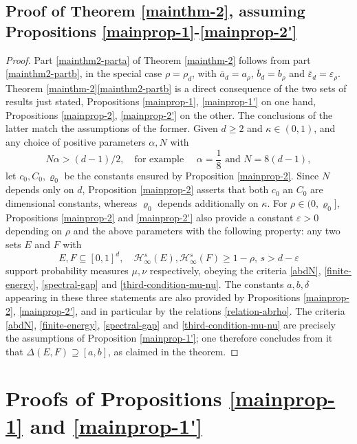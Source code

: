 \documentclass[a4paper,11pt]{amsart}
\numberwithin{equation}{section}
\begin{document}
\subsection{Proof of Theorem \ref{mainthm-2}, assuming Propositions \ref{mainprop-1}-\ref{mainprop-2'}} \label{mainthm-2-proof-section} 
\begin{proof} 
Part \eqref{mainthm2-parta} of Theorem \ref{mainthm-2} follows from part \eqref{mainthm2-partb}, in the special case $\rho = \rho_d$, with $\bar{a}_d = a_{\rho}$, $\bar{b}_d = b_{\rho}$ and $\bar{\varepsilon}_d = \varepsilon_{\rho}$. Theorem \ref{mainthm-2}\eqref{mainthm2-partb} is a direct consequence of the two sets of results just stated, Propositions \ref{mainprop-1}, \ref{mainprop-1'} on one hand, Propositions \ref{mainprop-2}, \ref{mainprop-2'} on the other. The conclusions of the latter match the assumptions of the former. 
\vskip0.1in
\noindent Given $d \geq 2$ and $\kappa \in (0,1)$, and any choice of positive parameters $\alpha, N$ with  
\[N \alpha > (d-1)/2, \quad \text{for example } \quad \alpha = \frac18 \text{ and }  N = 8(d-1), \] 
let $c_0, C_0, \varrho_0$ be the constants ensured by Proposition \ref{mainprop-2}. Since $N$ depends only on $d$, Proposition \ref{mainprop-2} asserts that both $c_0$ an $C_0$ are dimensional constants, whereas $\varrho_0$ depends additionally on $\kappa$. For $\rho \in (0, \varrho_0]$, Propositions \ref{mainprop-2} and \ref{mainprop-2'} also provide a constant $\varepsilon > 0$ depending on $\rho$ and the above parameters with the following property: 
any two sets $E$ and $F$ with   
\[ E, F \subseteq [0,1]^d, \quad \mathcal H^s_{\infty}(E), \mathcal H^s_{\infty}(F) \geq 1 - \rho, \, s > d - \varepsilon \] 
support probability measures $\mu, \nu$ respectively, obeying the criteria \eqref{abdN}, \eqref{finite-energy}, \eqref{spectral-gap} and \eqref{third-condition-mu-nu}. The constants $a, b, \delta$ appearing in these three statements are also provided by Propositions \ref{mainprop-2}, \ref{mainprop-2'}, and in particular by the relations \eqref{relation-abrho}. The criteria \eqref{abdN}, \eqref{finite-energy}, \eqref{spectral-gap} and \eqref{third-condition-mu-nu} are precisely the assumptions of Proposition \ref{mainprop-1'}; one therefore concludes from it that $\Delta(E, F) \supseteq [a, b]$, as claimed in the theorem. 
\end{proof} 


\section{Proofs of Propositions \ref{mainprop-1} and \ref{mainprop-1'}} \label{mainprop-1-section}
\end{document}
